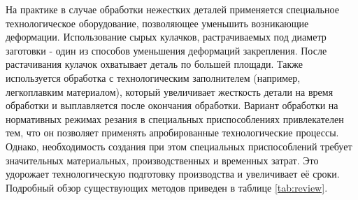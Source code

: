\documentclass[14pt,oneside,final]{extreport}
\begin{document}
	На практике в случае обработки нежестких деталей применяется специальное технологическое оборудование, позволяющее уменьшить возникающие деформации. Использование сырых кулачков, растрачиваемых под диаметр заготовки - один из способов уменьшения деформаций закрепления. После растачивания кулачок охватывает деталь по большей площади. Также используется обработка с технологическим заполнителем (например, легкоплавким материалом), который увеличивает жесткость детали на время обработки и выплавляется после окончания обработки. Вариант обработки на нормативных режимах резания в специальных приспособлениях привлекателен тем, что он позволяет применять апробированные технологические процессы. Однако, необходимость создания при этом специальных приспособлений требует значительных материальных, производственных и временных затрат. Это удорожает технологическую подготовку производства и увеличивает её сроки. Подробный обзор существующих методов приведен в таблице \ref{tab:review}.
\end{document}
